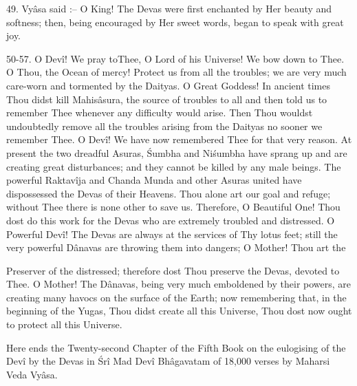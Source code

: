 49. Vy\^asa said :-- O King! The Devas were first enchanted by Her beauty and softness; then, being encouraged by Her sweet words, began to speak with great joy.

50-57. O Dev\^i! We pray toThee, O Lord of his Universe! We bow down to Thee. O Thou, the Ocean of mercy! Protect us from all the troubles; we are very much care-worn and tormented by the Daityas. O Great Goddess! In ancient times Thou didst kill Mahis\^asura, the source of troubles to all and then told us to remember Thee whenever any difficulty would arise. Then Thou wouldst undoubtedly remove all the troubles arising from the Daityas no sooner we remember Thee. O Dev\^i! We have now remembered Thee for that very reason. At present the two dreadful Asuras, \'Sumbha and Ni\'sumbha have sprang up and are creating great disturbances; and they cannot be killed by any male beings. The powerful Raktav\^ija and Chanda Munda and other Asuras united have dispossessed the Devas of their Heavens. Thou alone art our goal and refuge; without Thee there is none other to save us. Therefore, O Beautiful One! Thou dost do this work for the Devas who are extremely troubled and distressed. O Powerful Dev\^i! The Devas are always at the services of Thy lotus feet; still the very powerful D\^anavas are throwing them into dangers; O Mother! Thou art the

Preserver of the distressed; therefore dost Thou preserve the Devas, devoted to Thee. O Mother! The D\^anavas, being very much emboldened by their powers, are creating many havocs on the surface of the Earth; now remembering that, in the beginning of the Yugas, Thou didst create all this Universe, Thou dost now ought to protect all this Universe.

Here ends the Twenty-second Chapter of the Fifth Book on the eulogising of the Dev\^i by the Devas in \'Sr\^i Mad Dev\^i Bh\^agavatam of 18,000 verses by Maharsi Veda Vy\^asa.